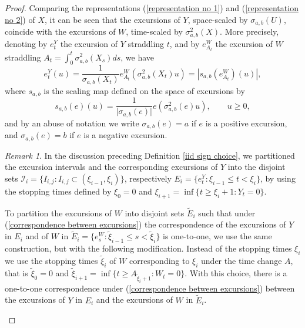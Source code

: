 \documentclass[reqno]{amsart}
\theoremstyle{definition}
\theoremstyle{remark}
\newtheorem{remark}[theorem]{Remark}
\numberwithin{equation}{section}
\begin{document}
\begin{proof}
Comparing the representations (\ref{representation no 1}) and (\ref{representation no 2}) of $X$, it can be seen that the excursions of $Y$, space-scaled by $\sigma_{a,b}(U)$, coincide with the excursions of $W$, time-scaled by $\sigma_{a,b}^2 (X)$. More precisely, denoting by $e^Y_t$ the excursion of $Y$ straddling $t$, and by $e^W_{A_t}$ the excursion of $W$ straddling $A_t=\int_0^t \sigma_{a,b}^2 (X_s)ds$, we have
\begin{equation}\label{correspondence between excursions}
e^Y_t(u)=\frac{1}{\sigma_{a,b}(X_t)} e^W_{A_t} (\sigma_{a,b}^2(X_t) u)=\left \vert s_{a,b}\left(e^W_{A_t}\right) (u)\right\vert,
\end{equation}
where $s_{a,b}$ is the scaling map defined on the space of excursions by
\begin{equation}\label{scaling map s}
s_{a,b}(e)(u)=\frac{1}{\vert \sigma_{a,b}(e)\vert} e\left(\sigma_{a,b}^2(e) u\right), \qquad u\geq 0,
\end{equation}
and by an abuse of notation we write $\sigma_{a,b}(e)=a$ if $e$ is a positive excursion, and $\sigma_{a,b}(e)=b$ if $e$ is a negative excursion.

\begin{remark}
In the discussion preceding Definition \ref{iid sign choice}, we partitioned the excursion intervals and the corresponding excursions of $Y$ into the disjoint sets $\mathcal{I}_i=\{I_{i,j}: I_{i,j}\subset (\xi_{i-1},\xi_i)\}$, respectively $E_i=\{e^Y_t: \xi_{i-1}\leq t <\xi_i\}$, by using the stopping times defined by $\xi_0=0$ and $\xi_{i+1}=\inf \{t\geq \xi_i +1: Y_t=0\}$.

To partition the excursions of $W$ into disjoint sets $\widetilde{E}_i$ such that under (\ref{correspondence between excursions}) the correspondence of the excursions of $Y$ in $E_i$ and of $W$ in $\widetilde{E}_i=\{e^W_s: \widetilde{\xi}_{i-1}\leq s< \widetilde{\xi}_{i}\}$ is one-to-one, we use the same construction, but with the following modification. Instead of the stopping times $\xi_i$ we use the stopping times $\widetilde{\xi}_i$ of $W$ corresponding to $\xi_i$ under the time change $A$, that is $\widetilde{\xi}_0=0$ and $\widetilde{\xi}_{i+1}=\inf \{t\geq A_{\widetilde{\xi}_i +1}: W_t=0\}$. With this choice, there is a one-to-one correspondence under (\ref{correspondence between excursions}) between the excursions of $Y$ in $E_i$ and the excursions of $W$ in $\widetilde{E}_i$.
\end{remark}


\end{proof}
\end{document}
